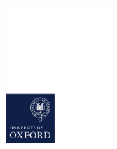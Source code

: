 \documentclass{beamer}
\begin{document}
\begin{frame}
	\begin{center}
		\vspace{1cm}
		\includegraphics[width=0.3\textwidth,trim=0 0 117mm 183mm,clip]{ox_brand_cmyk_pos.pdf}
	\end{center}
\end{frame}
\end{document}

